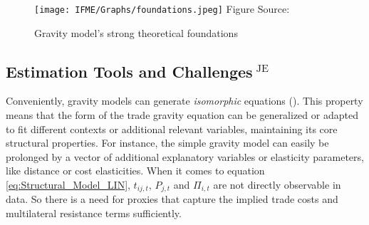 







\begin{figure}[htbp]
    \centering
    \caption[Gravity model's strong theoretical foundations]{Gravity model's strong theoretical foundations}
    \texttt{[image: IFME/Graphs/foundations.jpeg]}
    \label{fig:theoretic_foundations}
    \small 
    Figure Source: \cite[p. 12]{yotov2016advanced}
\end{figure}

















\subsection[Estimation Tools and Challenges]{Estimation Tools and Challenges$^{\text{ JE}}$}
\label{subsec:estimation_tools}


Conveniently, gravity models can generate \textit{isomorphic} equations (\cite[p. 13]{yotov2016advanced}). This property means that the form of the trade gravity equation can be generalized or adapted to fit different contexts or additional relevant variables, maintaining its core structural properties. For instance, the simple gravity model can easily be prolonged by a vector of additional explanatory variables or elasticity parameters, like distance or cost elasticities. When it comes to equation \ref{eq:Structural_Model_LIN}, $t_{ij,t}$, $P_{j,t}$ and $\Pi_{i,t}$ are not directly observable in data. So there is a need for proxies that capture the implied trade costs and multilateral resistance terms sufficiently.   

